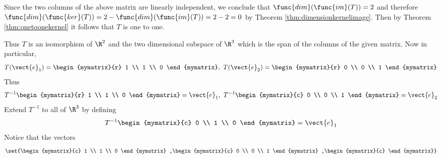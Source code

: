 \begin{solution}
Since the two columns of the above matrix are linearly independent, we conclude that $\func{dim}(\func{im}(T)) = 2$ and therefore $\func{dim}(\func{ker}(T)) = 2 - \func{dim}(\func{im}(T)) = 2-2 = 0$ by Theorem \ref{thm:dimensionkernelimage}. Then by Theorem \ref{thm:onetoonekernel} it follows that $T$ is one to one. 

Thus $T$ is an isomorphism of $\R^{2}$ and the two dimensional subspace of $\R^{3}$ which is the
span of the columns of the given matrix. Now in particular, 
\begin{equation*}
T(\vect{e}_{1})=\begin{mymatrix}{r}
1 \\ 
1 \\ 
0
\end{mymatrix} ,\ T(\vect{e}_{2})=\begin{mymatrix}{r}
0 \\ 
0 \\ 
1
\end{mymatrix}
\end{equation*}
Thus 
\begin{equation*}
T^{-1}\begin{mymatrix}{r}
1 \\ 
1 \\ 
0
\end{mymatrix} =\vect{e}_{1},\ T^{-1}\begin{mymatrix}{c}
0 \\ 
0 \\ 
1
\end{mymatrix} =\vect{e}_{2}
\end{equation*}
Extend $T^{-1}$ to all of $\R^{3}$ by defining 
\begin{equation*}
T^{-1}\begin{mymatrix}{c}
0 \\ 
1 \\ 
0
\end{mymatrix} =\vect{e}_{1}
\end{equation*}
Notice that the vectors
\begin{equation*}
\set{\begin{mymatrix}{c}
1 \\ 
1 \\ 
0
\end{mymatrix} ,\begin{mymatrix}{c}
0 \\ 
0 \\ 
1
\end{mymatrix} ,\begin{mymatrix}{c}

\end{mymatrix}}
\end{equation*}
\end{solution}
